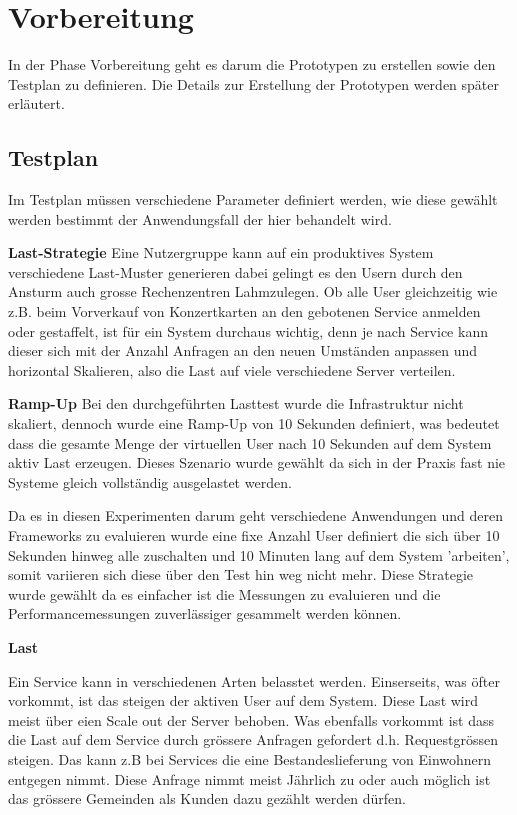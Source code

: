 \documentclass[main.tex]{subfiles}
\begin{document}
\section{Vorbereitung}
In der Phase Vorbereitung geht es darum die Prototypen zu erstellen sowie den Testplan zu definieren. Die Details zur Erstellung der Prototypen werden später erläutert.

\subsection{Testplan}
Im Testplan müssen verschiedene Parameter definiert werden, wie diese gewählt werden bestimmt der Anwendungsfall der hier behandelt wird.

\textbf{Last-Strategie}\newline
Eine Nutzergruppe kann auf ein produktives System verschiedene Last-Muster generieren dabei gelingt es den Usern durch den Ansturm auch grosse Rechenzentren Lahmzulegen. Ob alle User gleichzeitig wie z.B. beim Vorverkauf von Konzertkarten an den gebotenen Service anmelden oder gestaffelt, ist für ein System durchaus wichtig, denn je nach Service kann dieser sich mit der Anzahl Anfragen an den neuen Umständen anpassen und  horizontal Skalieren, also die Last auf viele verschiedene Server verteilen. 

\textbf{Ramp-Up}\newline
Bei den durchgeführten Lasttest wurde die Infrastruktur nicht skaliert, dennoch wurde eine Ramp-Up von 10 Sekunden definiert, was bedeutet dass die gesamte Menge der virtuellen User nach 10 Sekunden auf dem System aktiv Last erzeugen. Dieses Szenario wurde gewählt da sich in der Praxis fast nie Systeme gleich vollständig ausgelastet werden. 

Da es in diesen Experimenten darum geht verschiedene Anwendungen und deren Frameworks zu evaluieren wurde eine fixe Anzahl User definiert die sich über 10 Sekunden hinweg alle zuschalten und  10 Minuten lang auf dem System 'arbeiten', somit variieren sich diese über den Test hin weg nicht mehr. Diese Strategie wurde gewählt da es einfacher ist die Messungen zu evaluieren und die Performancemessungen zuverlässiger gesammelt werden können. 

\textbf{Last}

Ein Service kann in verschiedenen Arten belasstet werden. Einserseits, was öfter vorkommt, ist das steigen der aktiven User auf dem System. Diese Last wird meist über eien Scale out der Server behoben. Was ebenfalls vorkommt ist dass die Last auf dem Service durch grössere Anfragen gefordert d.h. Requestgrössen steigen. Das kann z.B bei Services die  eine Bestandeslieferung von Einwohnern entgegen nimmt. Diese Anfrage nimmt meist Jährlich zu oder auch möglich ist das grössere Gemeinden als Kunden dazu gezählt werden dürfen.  
\end{document}
